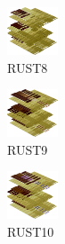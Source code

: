 \hspace{0.1cm}
\begin{minipage}[b]{0.15\linewidth}
\begin{figure}[H]                                                          
  \centering                                                             
  \begin{adjustbox}{width=1.5cm,center}                                   
  \includegraphics[width=1.5cm]{src/colorspace_colourflow/flows/colourflow_24-45.png}%
  \end{adjustbox}                                                        
\caption*{RUST8}                                           
\end{figure}                                                               
\end{minipage}
\hspace{0.1cm}
\begin{minipage}[b]{0.15\linewidth}
\begin{figure}[H]                                                          
  \centering                                                             
  \begin{adjustbox}{width=1.5cm,center}                                   
  \includegraphics[width=1.5cm]{src/colorspace_colourflow/flows/colourflow_25-45.png}%
  \end{adjustbox}                                                        
\caption*{RUST9}                                           
\end{figure}                                                               
\end{minipage}
\hspace{0.1cm}
\begin{minipage}[b]{0.15\linewidth}
\begin{figure}[H]                                                          
  \centering                                                             
  \begin{adjustbox}{width=1.5cm,center}                                   
  \includegraphics[width=1.5cm]{src/colorspace_colourflow/flows/colourflow_26-45.png}%
  \end{adjustbox}                                                        
\caption*{RUST10}                                           
\end{figure}                                                               
\end{minipage}
